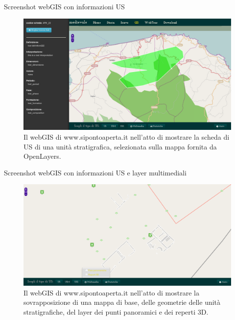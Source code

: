 \documentclass{beamer}
\begin{document}
		\begin{frame}{Screenshot webGIS con informazioni US}
			\begin{figure}[]
				\begin{center}
					\includegraphics[width=1\linewidth]{webgis}
				\end{center}
				\caption{Il webGIS di www.sipontoaperta.it nell'atto di mostrare la scheda di US di una unità stratigrafica, selezionata sulla mappa fornita da OpenLayers.}
				\label{fig:webgis_scheda}
			\end{figure}
		\end{frame}

		\begin{frame}{Screenshot webGIS con informazioni US e layer multimediali}
			\begin{figure}[]
				\begin{center}
					\includegraphics[width=1\linewidth]{screen_pois}
				\end{center}
				\caption{Il webGIS di www.sipontoaperta.it nell'atto di mostrare la sovrapposizione di una mappa di base, delle geometrie delle unità stratigrafiche, del layer dei punti panoramici e dei reperti 3D.}
				\label{fig:webgis_pois}
			\end{figure}
		\end{frame}
\end{document}
